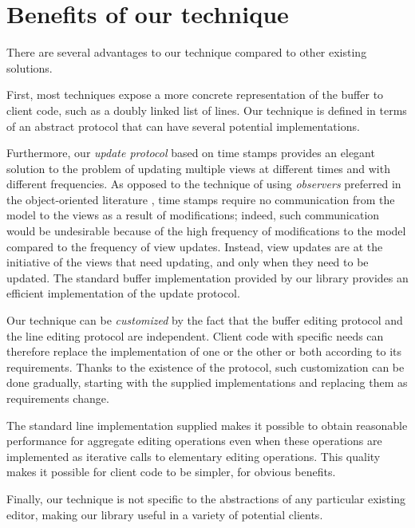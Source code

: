 \section{Benefits of our technique}
 
There are several advantages to our technique compared to other
existing solutions.

First, most techniques expose a more concrete representation of the
buffer to client code, such as a doubly linked list of lines.  Our
technique is defined in terms of an abstract \clos{} protocol that can
have several potential implementations.

Furthermore, our \emph{update protocol} based on time stamps provides
an elegant solution to the problem of updating multiple views at
different times and with different frequencies.  As opposed to the
technique of using \emph{observers} preferred in the object-oriented
literature \cite{Gamma:1998:DPC:551551}, time stamps require no
communication from the model to the views as a result of
modifications; indeed, such communication would be undesirable because
of the high frequency of modifications to the model compared to the
frequency of view updates.  Instead, view updates are at the
initiative of the views that need updating, and only when they need to
be updated.  The standard buffer implementation provided by our
library provides an efficient implementation of the update protocol.

Our technique can be \emph{customized} by the fact that the buffer
editing protocol and the line editing protocol are independent.
Client code with specific needs can therefore replace the
implementation of one or the other or both according to its
requirements.  Thanks to the existence of the \clos{} protocol, such
customization can be done gradually, starting with the supplied
implementations and replacing them as requirements change.

The standard line implementation supplied makes it possible to obtain
reasonable performance for aggregate editing operations even when
these operations are implemented as iterative calls to elementary
editing operations.  This quality makes it possible for client code to
be simpler, for obvious benefits.

Finally, our technique is not specific to the abstractions of any
particular existing editor, making our library useful in a variety of
potential clients.
